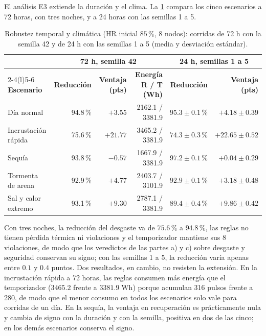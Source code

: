 El an\'alisis E3 extiende la duraci\'on y el clima. La \cref{tab:robustez_temporal} compara los cinco escenarios a 72 horas, con tres noches, y a 24 horas con las semillas 1 a 5.

\begin{table}[htbp]
\centering
\footnotesize
\caption{Robustez temporal y clim\'atica (HR inicial $85\,\%$, 8 nodos): corridas de 72 h con la semilla 42 y de 24 h con las semillas 1 a 5 (media y desviaci\'on est\'andar).}
\label{tab:robustez_temporal}
\begin{tabular*}{\textwidth}{@{\extracolsep{\fill}}lrrrrr@{}}
\toprule
 & \multicolumn{3}{c}{\textbf{72 h, semilla 42}} & \multicolumn{2}{c}{\textbf{24 h, semillas 1 a 5}} \\
\cmidrule(lr){2-4}\cmidrule(l){5-6}
\textbf{Escenario} & \textbf{Reducci\'on} & \textbf{Ventaja (pts)} & \textbf{Energ\'ia R / T (Wh)} & \textbf{Reducci\'on} & \textbf{Ventaja (pts)} \\
\midrule
D\'ia normal & 94.8\,\% & $+3.55$ & 2162.1 / 3381.9 & $95.3 \pm 0.1\,\%$ & $+4.18 \pm 0.39$ \\
Incrustaci\'on r\'apida & 75.6\,\% & $+21.77$ & 3465.2 / 3381.9 & $74.3 \pm 0.3\,\%$ & $+22.65 \pm 0.52$ \\
Sequ\'ia & 93.8\,\% & $-0.57$ & 1667.9 / 3381.9 & $97.2 \pm 0.1\,\%$ & $+0.04 \pm 0.29$ \\
Tormenta de arena & 92.9\,\% & $+4.77$ & 2403.7 / 3101.9 & $92.9 \pm 0.1\,\%$ & $+3.18 \pm 0.48$ \\
Sal y calor extremo & 93.1\,\% & $+9.30$ & 2787.1 / 3381.9 & $89.4 \pm 0.4\,\%$ & $+9.86 \pm 0.42$ \\
\bottomrule
\end{tabular*}
\end{table}

Con tres noches, la reducci\'on del desgaste va de $75.6\,\%$ a $94.8\,\%$, las reglas no tienen p\'erdida t\'ermica ni violaciones y el temporizador mantiene sus 8 violaciones, de modo que los veredictos de las partes a) y c) sobre desgaste y seguridad conservan su signo; con las semillas 1 a 5, la reducci\'on var\'ia apenas entre $0.1$ y $0.4$ puntos. Dos resultados, en cambio, no resisten la extensi\'on. En la incrustaci\'on r\'apida a 72 horas, las reglas consumen m\'as energ\'ia que el temporizador ($3465.2$ frente a $3381.9\;\text{Wh}$) porque acumulan 316 pulsos frente a 280, de modo que el menor consumo en todos los escenarios solo vale para corridas de un d\'ia. En la sequ\'ia, la ventaja en recuperaci\'on es pr\'acticamente nula y cambia de signo con la duraci\'on y con la semilla, positiva en dos de las cinco; en los dem\'as escenarios conserva el signo.

